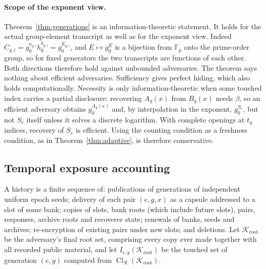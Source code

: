 \documentclass[pdflatex,sn-mathphys-num,twocolumn]{sn-jnl}
\theoremstyle{plain}
\theoremstyle{definition}
\newcommand{\Cl}{\operatorname{Cl}}
\newcommand{\F}{\mathbb{F}}
\begin{document}
\paragraph{Scope of the exponent view.}
Theorem~\ref{thm:generations} is an information-theoretic statement. It holds for the actual group-element transcript as well as for the exponent view. Indeed $C_{g,i}=g_0^{a_{g,i}}h_0^{b_{g,i}}=g_0^{E_{g,i}}$, and $E\mapsto g_0^E$ is a bijection from $\F_p$ onto the prime-order group, so for fixed generators the two transcripts are functions of each other. Both directions therefore hold against unbounded adversaries. The theorem says nothing about efficient adversaries. Sufficiency gives perfect hiding, which also holds computationally. Necessity is only information-theoretic when some touched index carries a partial disclosure: recovering $A_g(x)$ from $B_g(x)$ needs $\beta$, so an efficient adversary obtains $g_0^{A_g(x)}$ and, by interpolation in the exponent, $g_0^{S_e}$, but not $S_e$ itself unless it solves a discrete logarithm. With complete openings at $t_g$ indices, recovery of $S_e$ is efficient. Using the counting condition as a freshness condition, as in Theorem~\ref{thm:adaptive}, is therefore conservative.

\subsection{Temporal exposure accounting}
A history is a finite sequence of: publications of generations of independent uniform epoch seeds; delivery of each pair $(e,g,x)$ as a capsule addressed to a slot of some bank; copies of slots, bank roots (which include future slots), pairs, responses, archive roots and recoverer state; renewals of banks, seeds and archives; re-encryption of existing pairs under new slots; and deletions. Let $\mathcal K_{\mathrm{root}}$ be the adversary's final root set, comprising every copy ever made together with all recorded public material, and let $I_{e,g}(\mathcal K_{\mathrm{root}})$ be the touched set of generation $(e,g)$ computed from $\Cl_{\mathcal R}(\mathcal K_{\mathrm{root}})$.
\end{document}
